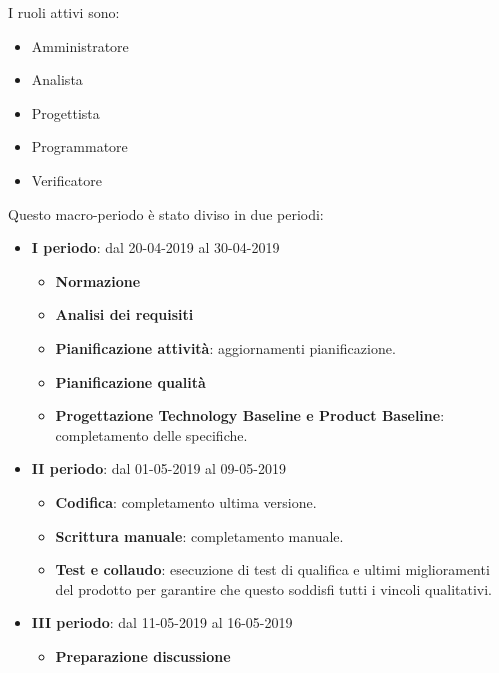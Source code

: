         I ruoli attivi sono: 
        \begin{itemize}
            \item Amministratore
            \item Analista
            \item Progettista
            \item Programmatore
            \item Verificatore
        \end{itemize}
        Questo macro-periodo è stato diviso in due periodi:
		\begin{itemize}
			\item \textbf{I periodo}: dal 20-04-2019 al 30-04-2019
			\begin{itemize}
    	        \item \textbf{Normazione}
    	        \item \textbf{Analisi dei requisiti}
    	        \item \textbf{Pianificazione attività}: aggiornamenti pianificazione.
    	        \item \textbf{Pianificazione qualità}
    	        \item \textbf{Progettazione Technology Baseline e Product Baseline}: completamento delle specifiche.
        	\end{itemize}
			\item \textbf{II periodo}: dal 01-05-2019 al 09-05-2019
			\begin{itemize}
    	        \item \textbf{Codifica}: completamento ultima versione.
    	        \item \textbf{Scrittura manuale}: completamento manuale.
    	        \item \textbf{Test e collaudo}: esecuzione di test di qualifica e ultimi miglioramenti del prodotto per
    	        garantire che questo soddisfi tutti i vincoli qualitativi.
			\end{itemize}
			\item \textbf{III periodo}: dal 11-05-2019 al 16-05-2019
			\begin{itemize}
				\item \textbf{Preparazione discussione}
			\end{itemize}
		\end{itemize}


